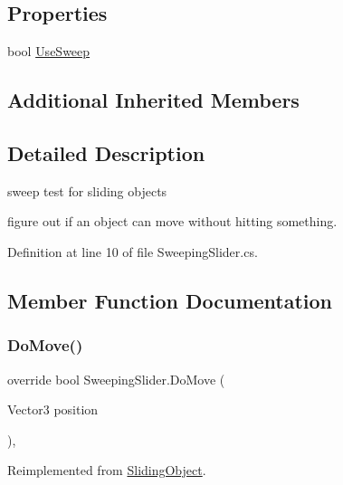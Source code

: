 \subsection*{Properties}
\begin{DoxyCompactItemize}
\item 
bool \mbox{\hyperlink{class_sweeping_slider_a3def56a1e81ee06a67744cc00d5bd622}{Use\+Sweep}}
\end{DoxyCompactItemize}
\subsection*{Additional Inherited Members}


\subsection{Detailed Description}
sweep test for sliding objects 

figure out if an object can move without hitting something. 

Definition at line 10 of file Sweeping\+Slider.\+cs.



\subsection{Member Function Documentation}
\mbox{\label{class_sweeping_slider_aded891966e0230cae066605d1d5aaf78}} 
\subsubsection{\texorpdfstring{Do\+Move()}{DoMove()}}
{\footnotesize\ttfamily override bool Sweeping\+Slider.\+Do\+Move (\begin{DoxyParamCaption}\item[{Vector3}]{position }\end{DoxyParamCaption})\hspace{0.3cm}{\ttfamily [protected]}, {\ttfamily [virtual]}}



Reimplemented from \mbox{\hyperlink{class_sliding_object_ab5a9f4c9a30b3fd106f9c4ea9218d679}{Sliding\+Object}}.



